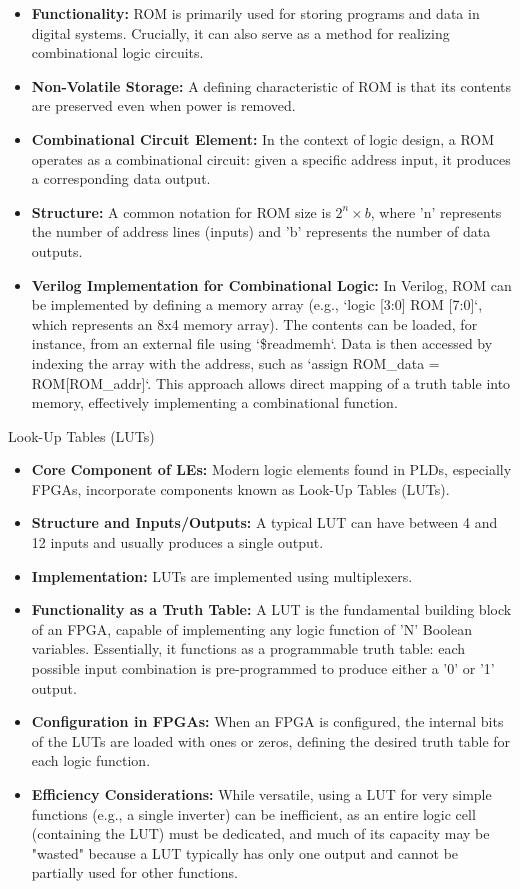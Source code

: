 \documentclass{article}
\begin{document}
\begin{itemize}
\begin{itemize}
    \item \textbf{Functionality:} ROM is primarily used for storing programs and data in digital systems. Crucially, it can also serve as a method for realizing combinational logic circuits.
    \item \textbf{Non-Volatile Storage:} A defining characteristic of ROM is that its contents are preserved even when power is removed.
    \item \textbf{Combinational Circuit Element:} In the context of logic design, a ROM operates as a combinational circuit: given a specific address input, it produces a corresponding data output.
    \item \textbf{Structure:} A common notation for ROM size is $2^n \times b$, where 'n' represents the number of address lines (inputs) and 'b' represents the number of data outputs.
    \item \textbf{Verilog Implementation for Combinational Logic:} In Verilog, ROM can be implemented by defining a memory array (e.g., `logic [3:0] ROM [7:0]`, which represents an 8x4 memory array). The contents can be loaded, for instance, from an external file using `\$readmemh`. Data is then accessed by indexing the array with the address, such as `assign ROM\_data = ROM[ROM\_addr]`. This approach allows direct mapping of a truth table into memory, effectively implementing a combinational function.
\end{itemize}

Look-Up Tables (LUTs)

\begin{itemize}
    \item \textbf{Core Component of LEs:} Modern logic elements found in PLDs, especially FPGAs, incorporate components known as Look-Up Tables (LUTs).
    \item \textbf{Structure and Inputs/Outputs:} A typical LUT can have between 4 and 12 inputs and usually produces a single output.
    \item \textbf{Implementation:} LUTs are implemented using multiplexers.
    \item \textbf{Functionality as a Truth Table:} A LUT is the fundamental building block of an FPGA, capable of implementing any logic function of 'N' Boolean variables. Essentially, it functions as a programmable truth table: each possible input combination is pre-programmed to produce either a '0' or '1' output.
    \item \textbf{Configuration in FPGAs:} When an FPGA is configured, the internal bits of the LUTs are loaded with ones or zeros, defining the desired truth table for each logic function.
    \item \textbf{Efficiency Considerations:} While versatile, using a LUT for very simple functions (e.g., a single inverter) can be inefficient, as an entire logic cell (containing the LUT) must be dedicated, and much of its capacity may be "wasted" because a LUT typically has only one output and cannot be partially used for other functions.
\end{itemize}


\end{itemize}
\end{document}
